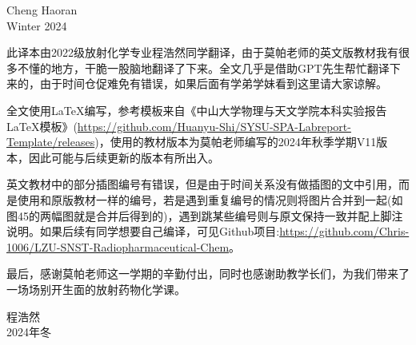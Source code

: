 \documentclass[dvipsnames, svgnames,a4paper,11pt]{article}
\begin{document}
\begin{flushright}

    Cheng Haoran \\
    Winter 2024
    
\end{flushright}

此译本由2022级放射化学专业程浩然同学翻译，由于莫帕老师的英文版教材我有很多不懂的地方，干脆一股脑地翻译了下来。全文几乎是借助GPT先生帮忙翻译下来的，由于时间仓促难免有错误，如果后面有学弟学妹看到这里请大家谅解。

全文使用\LaTeX 编写，参考模板来自《中山大学物理与天文学院本科实验报告LaTeX模板》(\url{https://github.com/Huanyu-Shi/SYSU-SPA-Labreport-Template/releases})，使用的教材版本为莫帕老师编写的2024年秋季学期V11版本，因此可能与后续更新的版本有所出入。

英文教材中的部分插图编号有错误，但是由于时间关系没有做插图的文中引用，而是使用和原版教材一样的编号，若是遇到重复编号的情况则将图片合并到一起(如图45的两幅图就是合并后得到的)，遇到跳某些编号则与原文保持一致并配上脚注说明。如果后续有同学想要自己编译，可见Github项目:\url{https://github.com/Chris-1006/LZU-SNST-Radiopharmaceutical-Chem}。

最后，感谢莫帕老师这一学期的辛勤付出，同时也感谢助教学长们，为我们带来了一场场别开生面的放射药物化学课。

\begin{flushright}

程浩然\\
2024年冬

\end{flushright}
\end{document}
